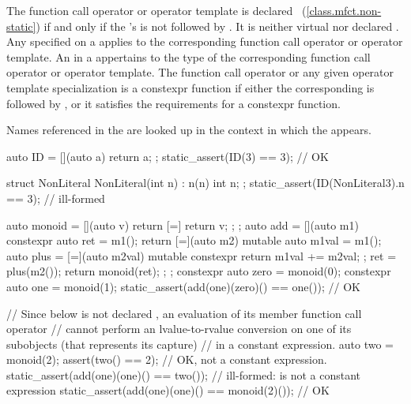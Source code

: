 \pnum
The function call operator or operator template is declared
~(\ref{class.mfct.non-static}) if and only if the
's  is not
followed by . It is neither virtual nor declared . Any
 specified on a 
applies to the corresponding function call operator or operator template.
An  in a  appertains
to the type of the corresponding function call operator or operator template.
The function call operator or any given operator template specialization
is a constexpr function if either
the corresponding 
 is followed by , or
it satisfies the requirements for a constexpr function.
\begin{note} Names referenced in
the  are looked up in the context in which the
 appears. \end{note}
\begin{example}
\begin{codeblock}
auto ID = [](auto a) { return a; };
static_assert(ID(3) == 3); // OK

struct NonLiteral {
  NonLiteral(int n) : n(n) { }
  int n;
};
static_assert(ID(NonLiteral{3}).n == 3); // ill-formed
\end{codeblock}
\end{example}

\pnum
\begin{example}
\begin{codeblock}
auto monoid = [](auto v) { return [=] { return v; }; };
auto add = [](auto m1) constexpr {
  auto ret = m1();
  return [=](auto m2) mutable {
    auto m1val = m1();
    auto plus = [=](auto m2val) mutable constexpr
                   { return m1val += m2val; };
    ret = plus(m2());
    return monoid(ret);
  };
};
constexpr auto zero = monoid(0);
constexpr auto one = monoid(1);
static_assert(add(one)(zero)() == one()); // OK

// Since  below is not declared , an evaluation of its  member function call operator
// cannot perform an lvalue-to-rvalue conversion on one of its subobjects (that represents its capture)
// in a constant expression.
auto two = monoid(2);
assert(two() == 2); // OK, not a constant expression.
static_assert(add(one)(one)() == two()); // ill-formed:  is not a constant expression
static_assert(add(one)(one)() == monoid(2)()); // OK
\end{codeblock}
\end{example}

